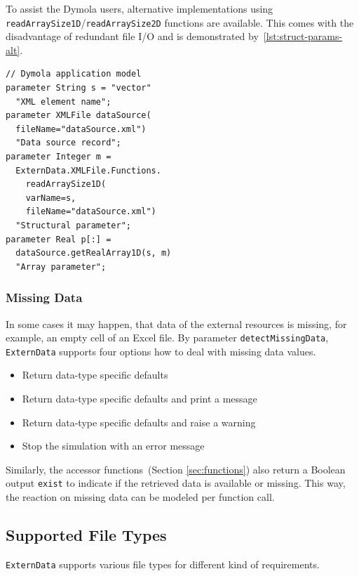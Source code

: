 \documentclass{modelica}
\newcommand{\modelica}[1]{\lstinline[language=modelica]|#1|}
\begin{document}
To assist the Dymola users, alternative implementations using \modelica{readArraySize1D}/\modelica{readArraySize2D} functions are available.
This comes with the disadvantage of redundant file I/O and is demonstrated by~\autoref{lst:struct-params-alt}.

\begin{lstlisting}[caption=Accessing structural parameters in Dymola, label=lst:struct-params-alt, language=modelica]
// Dymola application model
parameter String s = "vector"
  "XML element name";
parameter XMLFile dataSource(
  fileName="dataSource.xml")
  "Data source record";
parameter Integer m =
  ExternData.XMLFile.Functions.
    readArraySize1D(
    varName=s,
    fileName="dataSource.xml")
  "Structural parameter";
parameter Real p[:] =
  dataSource.getRealArray1D(s, m)
  "Array parameter";
\end{lstlisting}

\subsubsection{Missing Data}

In some cases it may happen, that data of the external resources is missing, for example, an empty cell of an Excel file.
By parameter \modelica{detectMissingData}, \modelica{ExternData} supports four options how to deal with missing data values.

\begin{itemize}
 \item Return data-type specific defaults
 \item Return data-type specific defaults and print a message
 \item Return data-type specific defaults and raise a warning
 \item Stop the simulation with an error message
\end{itemize}

Similarly, the accessor functions~(Section \ref{sec:functions}) also return a Boolean output \modelica{exist} to indicate if the retrieved data is available or missing.
This way, the reaction on missing data can be modeled per function call.

\subsection{Supported File Types}

\modelica{ExternData} supports various file types for different kind of requirements.
\end{document}
